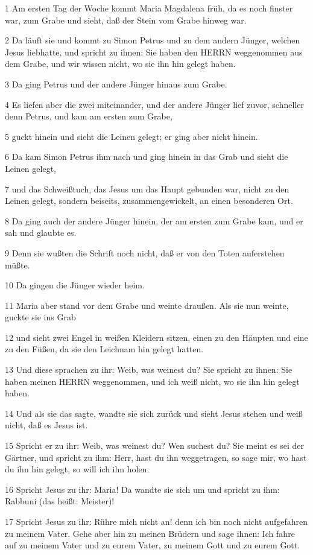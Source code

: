 \par 1 Am ersten Tag der Woche kommt Maria Magdalena früh, da es noch finster war, zum Grabe und sieht, daß der Stein vom Grabe hinweg war.
\par 2 Da läuft sie und kommt zu Simon Petrus und zu dem andern Jünger, welchen Jesus liebhatte, und spricht zu ihnen: Sie haben den HERRN weggenommen aus dem Grabe, und wir wissen nicht, wo sie ihn hin gelegt haben.
\par 3 Da ging Petrus und der andere Jünger hinaus zum Grabe.
\par 4 Es liefen aber die zwei miteinander, und der andere Jünger lief zuvor, schneller denn Petrus, und kam am ersten zum Grabe,
\par 5 guckt hinein und sieht die Leinen gelegt; er ging aber nicht hinein.
\par 6 Da kam Simon Petrus ihm nach und ging hinein in das Grab und sieht die Leinen gelegt,
\par 7 und das Schweißtuch, das Jesus um das Haupt gebunden war, nicht zu den Leinen gelegt, sondern beiseits, zusammengewickelt, an einen besonderen Ort.
\par 8 Da ging auch der andere Jünger hinein, der am ersten zum Grabe kam, und er sah und glaubte es.
\par 9 Denn sie wußten die Schrift noch nicht, daß er von den Toten auferstehen müßte.
\par 10 Da gingen die Jünger wieder heim.
\par 11 Maria aber stand vor dem Grabe und weinte draußen. Als sie nun weinte, guckte sie ins Grab
\par 12 und sieht zwei Engel in weißen Kleidern sitzen, einen zu den Häupten und eine zu den Füßen, da sie den Leichnam hin gelegt hatten.
\par 13 Und diese sprachen zu ihr: Weib, was weinest du? Sie spricht zu ihnen: Sie haben meinen HERRN weggenommen, und ich weiß nicht, wo sie ihn hin gelegt haben.
\par 14 Und als sie das sagte, wandte sie sich zurück und sieht Jesus stehen und weiß nicht, daß es Jesus ist.
\par 15 Spricht er zu ihr: Weib, was weinest du? Wen suchest du? Sie meint es sei der Gärtner, und spricht zu ihm: Herr, hast du ihn weggetragen, so sage mir, wo hast du ihn hin gelegt, so will ich ihn holen.
\par 16 Spricht Jesus zu ihr: Maria! Da wandte sie sich um und spricht zu ihm: Rabbuni (das heißt: Meister)!
\par 17 Spricht Jesus zu ihr: Rühre mich nicht an! denn ich bin noch nicht aufgefahren zu meinem Vater. Gehe aber hin zu meinen Brüdern und sage ihnen: Ich fahre auf zu meinem Vater und zu eurem Vater, zu meinem Gott und zu eurem Gott.
